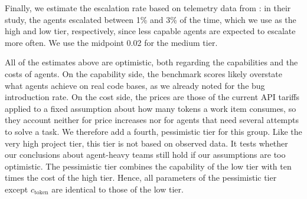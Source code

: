 \documentclass[smallextended]{svjour3}       %
\begin{document}
Finally, we estimate the escalation rate based on telemetry data from \cite{baumann2026swechat}: in their study, the agents escalated between 1\% and 3\% of the time, which we use as the high and low tier, respectively, since less capable agents are expected to escalate more often. We use the midpoint 0.02 for the medium tier.

All of the estimates above are optimistic, both regarding the capabilities and the costs of agents. On the capability side, the benchmark scores likely overstate what agents achieve on real code bases, as we already noted for the bug introduction rate. On the cost side, the prices are those of the current API tariffs applied to a fixed assumption about how many tokens a work item consumes, so they account neither for price increases nor for agents that need several attempts to solve a task. We therefore add a fourth, pessimistic tier for this group. Like the very high project tier, this tier is not based on observed data. It tests whether our conclusions about agent-heavy teams still hold if our assumptions are too optimistic. The pessimistic tier combines the capability of the low tier with ten times the cost of the high tier. Hence, all parameters of the pessimistic tier except $c_\mathrm{token}$ are identical to those of the low tier.
\end{document}
